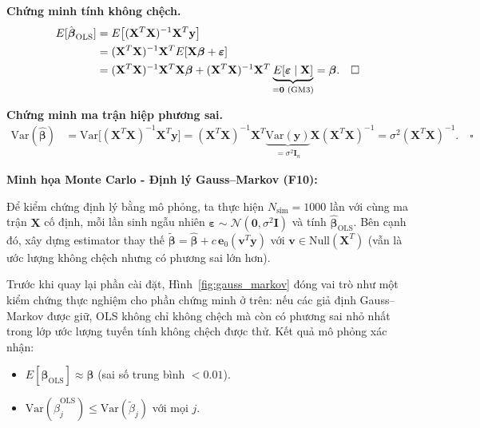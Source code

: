 \textbf{Chứng minh tính không chệch.}
\begin{align}
    E[\hat{\boldsymbol{\beta}}_{\mathrm{OLS}}]
    &= E\bigl[(\mathbf{X}^T\mathbf{X})^{-1}\mathbf{X}^T\mathbf{y}\bigr] \notag \\
    &= (\mathbf{X}^T\mathbf{X})^{-1}\mathbf{X}^T
       E[\mathbf{X}\boldsymbol{\beta} + \boldsymbol{\varepsilon}] \notag \\
    &= (\mathbf{X}^T\mathbf{X})^{-1}\mathbf{X}^T\mathbf{X}\boldsymbol{\beta}
       + (\mathbf{X}^T\mathbf{X})^{-1}\mathbf{X}^T
         \underbrace{E[\boldsymbol{\varepsilon} \mid \mathbf{X}]}_{=\mathbf{0}\text{ (GM3)}}
    = \boldsymbol{\beta}. \quad \square
\end{align}

\textbf{Chứng minh ma trận hiệp phương sai.}
\begin{align}
    \mathrm{Var}(\hat{\boldsymbol{\beta}})
    &= \mathrm{Var}\bigl[(\mathbf{X}^T\mathbf{X})^{-1}\mathbf{X}^T\mathbf{y}\bigr]
     = (\mathbf{X}^T\mathbf{X})^{-1}\mathbf{X}^T
       \underbrace{\mathrm{Var}(\mathbf{y})}_{=\sigma^2\mathbf{I}_n}
       \mathbf{X}(\mathbf{X}^T\mathbf{X})^{-1}
     = \sigma^2(\mathbf{X}^T\mathbf{X})^{-1}. \quad \square
\end{align}

\textbf{Minh họa Monte Carlo - Định lý Gauss–Markov (F10):}

Để kiểm chứng định lý bằng mô phỏng, ta thực hiện $N_{\mathrm{sim}} = 1000$
lần với cùng ma trận $\mathbf{X}$ cố định, mỗi lần sinh ngẫu nhiên
$\boldsymbol{\varepsilon} \sim \mathcal{N}(\mathbf{0}, \sigma^2\mathbf{I})$
và tính $\hat{\boldsymbol{\beta}}_{\mathrm{OLS}}$. Bên cạnh đó, xây dựng
estimator thay thế $\tilde{\boldsymbol{\beta}} = \hat{\boldsymbol{\beta}} +
c\,\mathbf{e}_0 (\mathbf{v}^T\mathbf{y})$ với
$\mathbf{v} \in \mathrm{Null}(\mathbf{X}^T)$
(vẫn là ước lượng không chệch nhưng có phương sai lớn hơn).

Trước khi quay lại phần cài đặt, Hình~\ref{fig:gauss_markov} đóng vai trò như một kiểm chứng
thực nghiệm cho phần chứng minh ở trên: nếu các giả định Gauss--Markov được giữ, OLS không chỉ
không chệch mà còn có phương sai nhỏ nhất trong lớp ước lượng tuyến tính không chệch được thử.
Kết quả mô phỏng xác nhận:
\begin{itemize}
    \item $E[\hat{\boldsymbol{\beta}}_{\mathrm{OLS}}] \approx \boldsymbol{\beta}$
          (sai số trung bình $< 0.01$).
    \item $\mathrm{Var}(\hat{\beta}_j^{\mathrm{OLS}}) \leq
          \mathrm{Var}(\tilde{\beta}_j)$ với mọi $j$.
\end{itemize}

